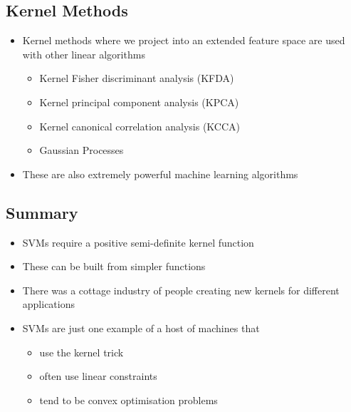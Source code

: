 \begin{slide}
\section{Kernel Methods}

\begin{PauseHighLight}
  \begin{itemize}
  \item Kernel methods where we project into an extended feature space
    are used with other linear algorithms
    \begin{itemize}
    \item Kernel Fisher discriminant analysis (KFDA)
    \item Kernel principal component analysis (KPCA)
    \item Kernel canonical correlation analysis (KCCA)
    \item Gaussian Processes\pause
    \end{itemize}
  \item These are also extremely powerful machine learning algorithms\pause
  \end{itemize}
\end{PauseHighLight}

\end{slide}

\begin{slide}
\section[-1]{Summary}

\begin{PauseHighLight}
  \begin{itemize}
  \item SVMs require a positive semi-definite kernel function\pause
  \item These can be built from simpler functions\pause
  \item There was a cottage industry of people creating new kernels
    for different applications\pause
  \item SVMs are just one example of a host of machines that
    \begin{itemize}
    \item use the kernel trick
    \item often use linear constraints
    \item tend to be convex optimisation problems\pause
    \end{itemize}
  \end{itemize}
\end{PauseHighLight}

\end{slide}



